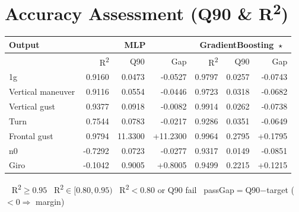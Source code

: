 \documentclass[9pt,a4paper]{article}
\begin{document}
\section{Accuracy Assessment (Q90 \& R\textsuperscript{2})}
\begin{minipage}{\linewidth}
\renewcommand{\arraystretch}{1.2}
\begin{tabular}{l|rrr|rrr|}
  \hline
  \textbf{Output} & \multicolumn{3}{c|}{\textbf{MLP}} & \multicolumn{3}{c|}{\textbf{GradientBoosting}\ $\star$} \\ \hline
  & R\textsuperscript{2} & Q90 & Gap & R\textsuperscript{2} & Q90 & Gap \\ \hline
  1g & \cellcolor{r2amber}0.9160 & \cellcolor{passgreen}0.0473 & \cellcolor{passgreen}-0.0527 & \cellcolor{r2green}0.9797 & \cellcolor{passgreen}0.0257 & \cellcolor{passgreen}-0.0743 \\ \hline
  Vertical maneuver & \cellcolor{r2amber}0.9116 & \cellcolor{passgreen}0.0554 & \cellcolor{passgreen}-0.0446 & \cellcolor{r2green}0.9723 & \cellcolor{passgreen}0.0318 & \cellcolor{passgreen}-0.0682 \\ \hline
  Vertical gust & \cellcolor{r2amber}0.9377 & \cellcolor{passgreen}0.0918 & \cellcolor{passgreen}-0.0082 & \cellcolor{r2green}0.9914 & \cellcolor{passgreen}0.0262 & \cellcolor{passgreen}-0.0738 \\ \hline
  Turn & \cellcolor{failred}0.7544 & \cellcolor{passgreen}0.0783 & \cellcolor{passgreen}-0.0217 & \cellcolor{r2amber}0.9286 & \cellcolor{passgreen}0.0351 & \cellcolor{passgreen}-0.0649 \\ \hline
  Frontal gust & \cellcolor{r2green}0.9794 & \cellcolor{failred}11.3300 & \cellcolor{failred}+11.2300 & \cellcolor{r2green}0.9964 & \cellcolor{failred}0.2795 & \cellcolor{failred}+0.1795 \\ \hline
  n0 & \cellcolor{failred}-0.7292 & \cellcolor{passgreen}0.0723 & \cellcolor{passgreen}-0.0277 & \cellcolor{r2amber}0.9317 & \cellcolor{passgreen}0.0149 & \cellcolor{passgreen}-0.0851 \\ \hline
  Giro & \cellcolor{failred}-0.1042 & \cellcolor{failred}0.9005 & \cellcolor{failred}+0.8005 & \cellcolor{r2amber}0.9499 & \cellcolor{failred}0.2215 & \cellcolor{failred}+0.1215 \\ \hline
\end{tabular}
\par\vspace{4pt}
{\footnotesize \colorbox{r2green}{\ } R\textsuperscript{2}$\!\geq\!0.95$\enspace \colorbox{r2amber}{\ } R\textsuperscript{2}$\!\in[0.80,0.95)$\enspace \colorbox{failred}{\ } R\textsuperscript{2}$\!<\!0.80$ or Q90 fail\enspace \colorbox{passgreen}{\ } pass\enspace Gap$=$Q90$-$target ($<\!0\Rightarrow$ margin)}
\end{minipage}
\end{document}
